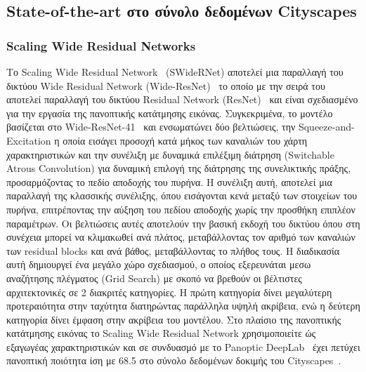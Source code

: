 \documentclass[12pt]{article}
\numberwithin{equation}{section}
\begin{document}
\subsection{State-of-the-art στο σύνολο δεδομένων Cityscapes}

\subsubsection{Scaling Wide Residual Networks}

Το Scaling Wide Residual Network~\cite{chen2021scalingwideresidualnetworks} (SWideRNet) αποτελεί μια παραλλαγή του δικτύου Wide Residual Network (Wide-ResNet)~\cite{zagoruyko2017wideresidualnetworks} το οποίο με την σειρά του αποτελεί παραλλαγή του δικτύου Residual Network (ResNet)~\cite{he2015deepresiduallearningimage} και είναι σχεδιασμένο για την εργασία της πανοπτικής κατάτμησης εικόνας. Συγκεκριμένα, το μοντέλο βασίζεται στο Wide-ResNet-41~\cite{zagoruyko2017wideresidualnetworks} και ενσωματώνει δύο βελτιώσεις, την Squeeze-and-Excitation η οποία εισάγει προσοχή κατά μήκος των καναλιών του χάρτη χαρακτηριστικών και την συνέλιξη με δυναμικά επιλέξιμη διάτρηση (Switchable Atrous Convolution) για δυναμική επιλογή της διάτρησης της συνελικτικής πράξης, προσαρμόζοντας το πεδίο αποδοχής του πυρήνα. Η συνέλιξη αυτή, αποτελεί μια παραλλαγή της κλασσικής συνέλιξης, όπου εισάγονται κενά μεταξύ των στοιχείων του πυρήνα, επιτρέποντας την αύξηση του πεδίου αποδοχής χωρίς την προσθήκη επιπλέον παραμέτρων. Οι βελτιώσεις αυτές αποτελούν την βασική εκδοχή του δικτύου όπου στη συνέχεια μπορεί να κλιμακωθεί ανά πλάτος, μεταβάλλοντας τον αριθμό των καναλιών των residual blocks και ανά βάθος, μεταβάλλοντας το πλήθος τους. Η διαδικασία αυτή δημιουργεί ένα μεγάλο χώρο σχεδιασμού, ο οποίος εξερευνάται μεσω αναζήτησης πλέγματος (Grid Search) με σκοπό να βρεθούν οι βέλτιστες αρχιτεκτονικές σε 2 διακριτές κατηγορίες. Η πρώτη κατηγορία δίνει μεγαλύτερη προτεραιότητα στην ταχύτητα διατηρώντας παράλληλα υψηλή ακρίβεια, ενώ η δεύτερη κατηγορία δίνει έμφαση στην ακρίβεια του μοντέλου. Στο πλαίσιο της πανοπτικής κατάτμησης εικόνας το Scaling Wide Residual Network χρησιμοποιείτε ώς εξαγωγέας χαρακτηριστικών και σε συνδυασμό με το Panoptic DeepLab~\cite{cheng2020panopticdeeplabsimplestrongfast} έχει πετύχει πανοπτική ποιότητα ίση με 68.5 στο σύνολο δεδομένων δοκιμής του Cityscapes~\cite{DBLP:journals/corr/CordtsORREBFRS16}. \\
\end{document}
